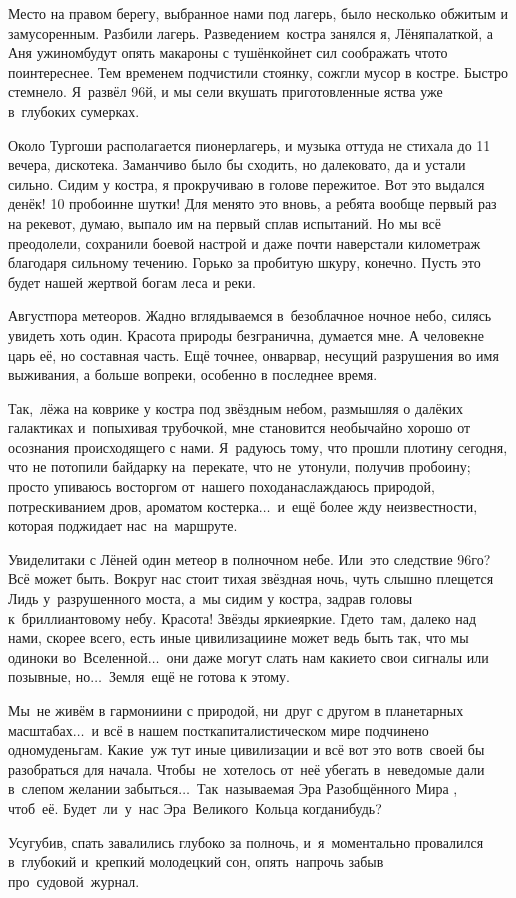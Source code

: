 Место на правом берегу, выбранное нами под лагерь, было несколько обжитым и замусоренным. Разбили лагерь. Разведением~костра занялся я, Лёня\mdash палаткой, а Аня ужином\mdash будут опять макароны с тушёнкой\mdash нет сил соображать что\sdash то поинтереснее. Тем временем подчистили стоянку, сожгли мусор в костре. Быстро стемнело. Я~развёл 96\sdash й, и мы сели вкушать приготовленные яства уже в~глубоких сумерках.

Около Тургоши располагается пионерлагерь, и музыка оттуда не стихала до 11 вечера, дискотека. Заманчиво было бы сходить, но далековато, да и устали сильно. Сидим у костра, я прокручиваю в голове пережитое. Вот это выдался денёк! 10 пробоин\mdash не шутки! Для меня\sdash то это вновь, а ребята вообще первый раз на реке\mdash вот, думаю, выпало им на первый сплав испытаний. Но мы всё преодолели, сохранили боевой настрой и даже почти наверстали километраж благодаря сильному течению. Горько за пробитую шкуру, конечно. Пусть это будет нашей жертвой богам леса и реки.

Август\mdash пора метеоров. Жадно вглядываемся в~безоблачное ночное небо, силясь увидеть хоть один. Красота природы безгранична, думается мне. А человек\mdash не царь её, но составная часть. Ещё точнее, он\mdash варвар, несущий разрушения во имя выживания, а больше вопреки, особенно в последнее время. 

\newpage
Так,~лёжа на коврике у костра под звёздным небом, размышляя о далёких галактиках и~попыхивая трубочкой, мне становится необычайно хорошо от осознания происходящего с нами. Я~радуюсь тому, что прошли плотину сегодня, что не потопили байдарку на~перекате, что не~утонули, получив пробоину; просто упиваюсь восторгом от~нашего похода\mdash наслаждаюсь природой, потрескиванием дров, ароматом костерка$\ldots$~и~ещё более жду неизвестности, которая поджидает нас~на~маршруте.

Увидели\sdash таки с Лёней один метеор в полночном небе. Или~это следствие 96\sdash го? Всё может быть. Вокруг нас стоит тихая звёздная ночь, чуть слышно плещется Лидь у~разрушенного моста, а~мы сидим у костра, задрав головы к~бриллиантовому небу. Красота! Звёзды яркие\sdash яркие. Где\sdash то~там, далеко над нами, скорее всего, есть иные цивилизации\mdash не может ведь быть так, что мы одиноки во~Вселенной$\ldots$~они даже могут слать нам какие\sdash то свои сигналы или позывные, но$\ldots$~Земля~ещё не готова к этому. 

Мы~не живём в гармонии\mdash ни с природой, ни~друг с другом в планетарных масштабах$\ldots$~и всё в нашем посткапиталистическом мире подчинено одному\mdash деньгам. Какие~уж тут иные цивилизации и всё вот это вот\mdash в~своей бы разобраться для начала. Чтобы~не~хотелось от~неё убегать в~неведомые дали в~слепом желании забыться$\ldots$~Так~называемая Эра Разобщённого Мира \cite{ТуманностьАндромеды}, чтоб~её. Будет~ли~у~нас Эра~Великого~Кольца когда\sdash нибудь?

Усугубив, спать завалились глубоко за полночь, и~я~моментально провалился в~глубокий и~крепкий молодецкий сон, опять~напрочь забыв про~судовой~журнал.

\begin{center}
\end{center}
